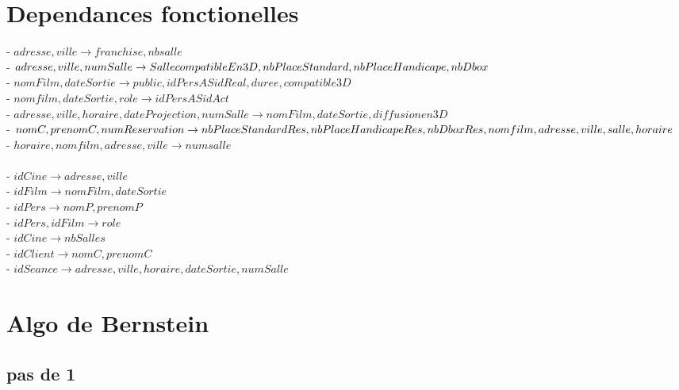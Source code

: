 \documentclass[a4paper,sffamily,12pt]{article}
\begin{document}
\vspace{0.5cm}

\section{Dependances fonctionelles}

\noindent- $adresse, ville \rightarrow franchise, nbsalle$ \\
- $adresse, ville, numSalle \rightarrow SallecompatibleEn3D, nbPlaceStandard,\\
 nbPlaceHandicape,nbDbox$ \\
- $nomFilm, dateSortie \rightarrow public, idPers AS idReal, duree, compatible3D$ \\
- $nomfilm, dateSortie, role \rightarrow idPers AS idAct$ \\
- $adresse, ville, horaire, dateProjection, numSalle \rightarrow nomFilm, dateSortie, diffusionen3D $ \\
- $nomC, prenomC, numReservation \rightarrow nbPlaceStandardRes, nbPlaceHandicapeRes,\\
 nbDboxRes, nomfilm, adresse, ville, salle, horaire$ \\
- $horaire, nomfilm, adresse, ville \rightarrow  numsalle$ \\ 
\\
- $idCine \rightarrow adresse, ville$ \\
- $idFilm \rightarrow nomFilm, dateSortie$ \\
- $idPers \rightarrow nomP, prenomP$ \\
- $idPers, idFilm \rightarrow role$ \\
- $idCine \rightarrow nbSalles$ \\
- $idClient \rightarrow nomC, prenomC$ \\
- $idSeance \rightarrow adresse, ville, horaire, dateSortie, numSalle$ \\

\vspace{0.5cm}

\section{Algo de Bernstein}

\subsection{pas de 1}

\vspace{0.5cm}
\end{document}
